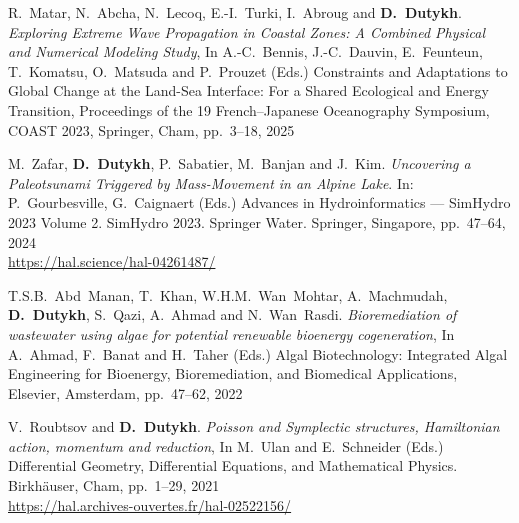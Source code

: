 \documentclass[final, a4paper, oneside, 12pt]{article}
\numberwithin{equation}{section}
\begin{document}
\begin{etaremune}



  \item R.~Matar, N.~Abcha, N.~Lecoq, E.-I.~Turki, I.~Abroug and \textbf{D.~Dutykh}. \textit{Exploring Extreme Wave Propagation in Coastal Zones: A Combined Physical and Numerical Modeling Study}, In A.-C.~Bennis, J.-C.~Dauvin, E.~Feunteun, T.~Komatsu, O.~Matsuda and P.~Prouzet (Eds.) Constraints and Adaptations to Global Change at the Land-Sea Interface: For a Shared Ecological and Energy Transition, Proceedings of the 19 French--Japanese Oceanography Symposium, COAST 2023, Springer, Cham, pp.~3--18, 2025 %



  \item M.~Zafar, \textbf{D.~Dutykh}, P.~Sabatier, M.~Banjan and J.~Kim. \textit{Uncovering a Paleotsunami Triggered by Mass-Movement in an Alpine Lake}. In: P.~Gourbesville, G.~Caignaert (Eds.) Advances in Hydroinformatics --- SimHydro 2023 Volume 2. SimHydro 2023. Springer Water. Springer, Singapore, pp.~47--64, 2024 \\ %
  \url{https://hal.science/hal-04261487/}


  
  \item T.S.B.~Abd~Manan, T.~Khan, W.H.M.~Wan~Mohtar, A.~Machmudah, \textbf{D.~Dutykh}, S.~Qazi, A.~Ahmad and N.~Wan~Rasdi. \textit{Bioremediation of wastewater using algae for potential renewable bioenergy cogeneration}, In A.~Ahmad, F.~Banat and H.~Taher (Eds.) Algal Biotechnology: Integrated Algal Engineering for Bioenergy, Bioremediation, and Biomedical Applications, Elsevier, Amsterdam, pp.~47--62, 2022 %


  
  \item V.~Roubtsov and \textbf{D.~Dutykh}. \textit{Poisson and Symplectic structures, Hamiltonian action, momentum and reduction}, In M.~Ulan and E.~Schneider (Eds.) Differential Geometry, Differential Equations, and Mathematical Physics. Birkh\"auser, Cham, pp.~1--29, 2021 \\ %
  \url{https://hal.archives-ouvertes.fr/hal-02522156/}


\end{etaremune}
\end{document}
